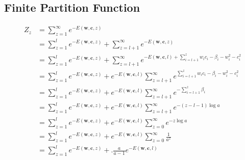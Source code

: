 \documentclass{article} %
\begin{document}
\subsection{Finite Partition Function}
\begin{equation}\begin{split}\label{z_finite_full}
Z_{z} &= \sum_{z=1}^{\infty} e^{-E(\mathbf{w}, \mathbf{c}, z)} \\ &= \sum_{z=1}^{l} e^{-E(\mathbf{w}, \mathbf{c}, z)} + \sum_{z=l+1}^{\infty} e^{-E(\mathbf{w}, \mathbf{c}, z)} \\ &= \sum_{z=1}^{l} e^{-E(\mathbf{w}, \mathbf{c}, z)} + \sum_{z=l+1}^{\infty} e^{-E(\mathbf{w}, \mathbf{c}, l) + \sum_{i=l+1}^{z} w_{i}c_{i} - \beta_{i} - w_{i}^{2} - c_{i}^{2}} \\ &= \sum_{z=1}^{l} e^{-E(\mathbf{w}, \mathbf{c}, z)} + e^{-E(\mathbf{w}, \mathbf{c}, l)} \sum_{z=l+1}^{\infty} e^{  \sum_{i=l+1}^{z} w_{i}c_{i} - \beta_{i} - w_{i}^{2} - c_{i}^{2}} \\ &= \sum_{z=1}^{l} e^{-E(\mathbf{w}, \mathbf{c}, z)} + e^{-E(\mathbf{w}, \mathbf{c}, l)} \sum_{z=l+1}^{\infty} e^{  -\sum_{i=l+1}^{z} \beta_{i} } \\ &= \sum_{z=1}^{l} e^{-E(\mathbf{w}, \mathbf{c}, z)} + e^{-E(\mathbf{w}, \mathbf{c}, l)} \sum_{z=l+1}^{\infty} e^{  -(z-l-1) \log a } \\ &= \sum_{z=1}^{l} e^{-E(\mathbf{w}, \mathbf{c}, z)} + e^{-E(\mathbf{w}, \mathbf{c}, l)} \sum_{z=0}^{\infty} e^{  -z \log a } \\ &= \sum_{z=1}^{l} e^{-E(\mathbf{w}, \mathbf{c}, z)} + e^{-E(\mathbf{w}, \mathbf{c}, l)} \sum_{z=0}^{\infty} \frac{1}{a^{  z }} \\ &= \sum_{z=1}^{l} e^{-E(\mathbf{w}, \mathbf{c}, z)} + .\frac{a}{a-1}e^{-E(\mathbf{w}, \mathbf{c}, l)}
\end{split}
\end{equation} 
\end{document}
